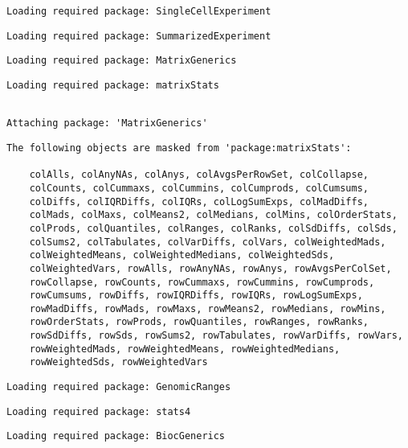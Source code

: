 \documentclass[
  letterpaper,
  DIV=11,
  numbers=noendperiod]{scrreprt}
\begin{document}
\begin{verbatim}
Loading required package: SingleCellExperiment
\end{verbatim}

\begin{verbatim}
Loading required package: SummarizedExperiment
\end{verbatim}

\begin{verbatim}
Loading required package: MatrixGenerics
\end{verbatim}

\begin{verbatim}
Loading required package: matrixStats
\end{verbatim}

\begin{verbatim}

Attaching package: 'MatrixGenerics'
\end{verbatim}

\begin{verbatim}
The following objects are masked from 'package:matrixStats':

    colAlls, colAnyNAs, colAnys, colAvgsPerRowSet, colCollapse,
    colCounts, colCummaxs, colCummins, colCumprods, colCumsums,
    colDiffs, colIQRDiffs, colIQRs, colLogSumExps, colMadDiffs,
    colMads, colMaxs, colMeans2, colMedians, colMins, colOrderStats,
    colProds, colQuantiles, colRanges, colRanks, colSdDiffs, colSds,
    colSums2, colTabulates, colVarDiffs, colVars, colWeightedMads,
    colWeightedMeans, colWeightedMedians, colWeightedSds,
    colWeightedVars, rowAlls, rowAnyNAs, rowAnys, rowAvgsPerColSet,
    rowCollapse, rowCounts, rowCummaxs, rowCummins, rowCumprods,
    rowCumsums, rowDiffs, rowIQRDiffs, rowIQRs, rowLogSumExps,
    rowMadDiffs, rowMads, rowMaxs, rowMeans2, rowMedians, rowMins,
    rowOrderStats, rowProds, rowQuantiles, rowRanges, rowRanks,
    rowSdDiffs, rowSds, rowSums2, rowTabulates, rowVarDiffs, rowVars,
    rowWeightedMads, rowWeightedMeans, rowWeightedMedians,
    rowWeightedSds, rowWeightedVars
\end{verbatim}

\begin{verbatim}
Loading required package: GenomicRanges
\end{verbatim}

\begin{verbatim}
Loading required package: stats4
\end{verbatim}

\begin{verbatim}
Loading required package: BiocGenerics
\end{verbatim}
\end{document}
